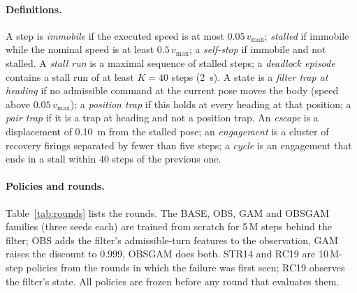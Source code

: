 \documentclass{l4dc2027}
\newcommand{\vmax}{v_{\max}}
\begin{document}
\paragraph{Definitions.} A step is \emph{immobile} if the executed speed is at most $0.05\,\vmax$; \emph{stalled} if immobile while the nominal speed is at least $0.5\,\vmax$; a \emph{self-stop} if immobile and not stalled. A \emph{stall run} is a maximal sequence of stalled steps; a \emph{deadlock episode} contains a stall run of at least $K = 40$ steps (\SI{2}{s}). A state is a \emph{filter trap at heading} if no admissible command at the current pose moves the body (speed above $0.05\,\vmax$); a \emph{position trap} if this holds at every heading at that position; a \emph{pair trap} if it is a trap at heading and not a position trap. An \emph{escape} is a displacement of \SI{0.10}{m} from the stalled pose; an \emph{engagement} is a cluster of recovery firings separated by fewer than five steps; a \emph{cycle} is an engagement that ends in a stall within 40 steps of the previous one.

\paragraph{Policies and rounds.} Table~\ref{tab:rounds} lists the rounds. The BASE, OBS, GAM and OBSGAM families (three seeds each) are trained from scratch for 5\,M steps behind the filter; OBS adds the filter's admissible-turn features to the observation, GAM raises the discount to 0.999, OBSGAM does both. STR14 and RC19 are 10\,M-step policies from the rounds in which the failure was first seen; RC19 observes the filter's state. All policies are frozen before any round that evaluates them.
\end{document}
